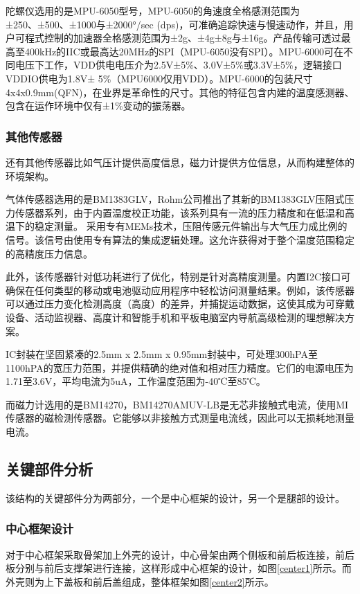 \documentclass[10pt]{article}
\begin{document}
陀螺仪选用的是MPU-6050型号，MPU-6050的角速度全格感测范围为±250、±500、±1000与±2000°/sec (dps)，可准确追踪快速与慢速动作，并且，用户可程式控制的加速器全格感测范围为±2g、±4g±8g与±16g。产品传输可透过最高至400kHz的IIC或最高达20MHz的SPI（MPU-6050没有SPI）。MPU-6000可在不同电压下工作，VDD供电电压介为2.5V±5\%、3.0V±5\%或3.3V±5\%，逻辑接口VDDIO供电为1.8V± 5\%（MPU6000仅用VDD）。MPU-6000的包装尺寸4x4x0.9mm(QFN)，在业界是革命性的尺寸。其他的特征包含内建的温度感测器、包含在运作环境中仅有±1\%变动的振荡器。

\subsubsection{其他传感器}
还有其他传感器比如气压计提供高度信息，磁力计提供方位信息，从而构建整体的环境架构。

气体传感器选用的是BM1383GLV，Rohm公司推出了其新的BM1383GLV压阻式压力传感器系列，由于内置温度校正功能，该系列具有一流的压力精度和在低温和高温下的稳定测量。
采用专有MEMs技术，压阻传感元件输出与大气压力成比例的信号。该信号由使用专有算法的集成逻辑处理。这允许获得对于整个温度范围稳定的高精度压力信息。

此外，该传感器针对低功耗进行了优化，特别是针对高精度测量。内置I2C接口可确保在任何类型的移动或电池驱动应用程序中轻松访问测量结果。例如，该传感器可以通过压力变化检测高度（高度）的差异，并捕捉运动数据，这使其成为可穿戴设备、活动监视器、高度计和智能手机和平板电脑室内导航高级检测的理想解决方案。

IC封装在坚固紧凑的2.5mm x 2.5mm x 0.95mm封装中，可处理300hPA至1100hPA的宽压力范围，并提供精确的绝对值和相对压力精度。它们的电源电压为1.71至3.6V，平均电流为5uA，工作温度范围为-40℃至85℃。

而磁力计选用的是BM14270，BM14270AMUV-LB是无芯非接触式电流，使用MI传感器的磁检测传感器。它能够以非接触方式测量电流线，因此可以无损耗地测量电流。

\subsection{关键部件分析}
该结构的关键部件分为两部分，一个是中心框架的设计，另一个是腿部的设计。

\subsubsection{中心框架设计}
对于中心框架采取骨架加上外壳的设计，中心骨架由两个侧板和前后板连接，前后板分别与前后支撑架进行连接，这样形成中心框架的设计，如图\ref{center1}所示。而外壳则为上下盖板和前后盖组成，整体框架如图\ref{center2}所示。
\end{document}
